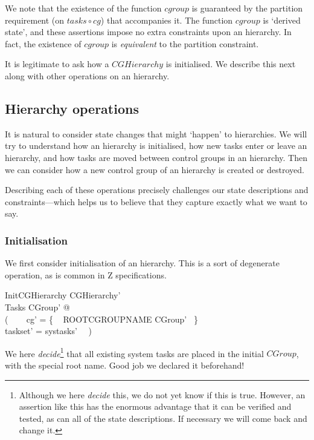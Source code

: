 \documentclass[a4paper,twoside,12pt]{article}
\begin{document}
We note that the existence of the function $cgroup$ is guaranteed by the partition requirement 
(on $tasks \circ cg$) that accompanies it. 
The function $cgroup$ is `derived state', and these assertions impose no extra constraints upon an hierarchy. 
In fact, the existence of $cgroup$ is \emph{equivalent} to the partition constraint.

It is legitimate to ask how a $CGHierarchy$ is initialised. 
We describe this next along with other operations on an hierarchy.


\subsection{Hierarchy operations}

It is natural to consider state changes that might `happen' to hierarchies.
We will try to understand how an hierarchy is initialised, how new tasks enter or leave an hierarchy, 
and how tasks are moved between control groups in an hierarchy.
Then we can consider how a new control group of an hierarchy is created or destroyed.

Describing each of these operations precisely challenges our state descriptions and constraints---which helps us
to believe that they capture exactly what we want to say.

\subsubsection{Initialisation}

We first consider initialisation of an hierarchy. This is a sort of degenerate operation, as is common in Z specifications.

\begin{schema}{InitCGHierarchy}
CGHierarchy' \\
\Xi Tasks
\where
\exists CGroup' @ \\
( ~~~ cg' = \{ ~ ROOTCGROUPNAME \mapsto \theta CGroup' ~\} \\
\land taskset' = systasks' ~~)
\end{schema}
We here \emph{decide}\footnote{Although we here \emph{decide} this, 
we do not yet know if this is true. However, an assertion like this has the enormous advantage that it can be verified 
and tested, as can all of the state descriptions. If necessary we will come back and change it.}
that all existing system tasks are placed in the initial $CGroup$, 
with the special root name. 
Good job we declared it beforehand!
\end{document}
